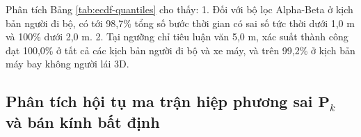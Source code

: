 \begin{table}[H]
\centering
\caption{Xác suất tích lũy sai số vị trí thực nghiệm $P(\varepsilon \le r)$ qua $108.000$ khung mẫu}
\label{tab:ecdf-quantiles}
\end{table}

Phân tích Bảng \ref{tab:ecdf-quantiles} cho thấy:
1. Đối với bộ lọc Alpha-Beta ở kịch bản người đi bộ, có tới 98,7\% tổng số bước thời gian có sai số tức thời dưới 1,0 m và 100\% dưới 2,0 m.
2. Tại ngưỡng chỉ tiêu luận văn 5,0 m, xác suất thành công đạt 100,0\% ở tất cả các kịch bản người đi bộ và xe máy, và trên 99,2\% ở kịch bản máy bay không người lái 3D.

\subsection{Phân tích hội tụ ma trận hiệp phương sai \texorpdfstring{$\mathbf{P}_k$}{Pk} và bán kính bất định}

